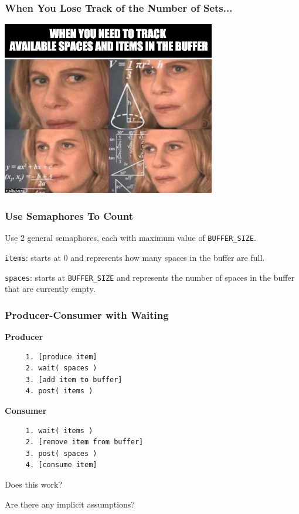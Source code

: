 \begin{frame}
	\frametitle{When You Lose Track of the Number of Sets...}

	\begin{center}
		\includegraphics[width=0.7\textwidth]{images/counting.jpeg}
	\end{center}

\end{frame}


\begin{frame}
	\frametitle{Use Semaphores To Count}

	Use 2 general semaphores, each with maximum value of \texttt{BUFFER\_SIZE}.

	\texttt{items}: starts at 0 and represents how many spaces in the buffer are full.

	\texttt{spaces}: starts at \texttt{BUFFER\_SIZE} and represents the number of spaces in the buffer that are currently empty.

\end{frame}


\begin{frame}[fragile]
	\frametitle{Producer-Consumer with Waiting}

	\begin{multicols}{2}
		\textbf{Producer}
		\begin{verbatim}
	 1. [produce item]
	 2. wait( spaces )
	 3. [add item to buffer]
	 4. post( items )
  \end{verbatim}
		\columnbreak
		\textbf{Consumer}
		\begin{verbatim}
	 1. wait( items )
	 2. [remove item from buffer]
	 3. post( spaces )
	 4. [consume item]
  \end{verbatim}
	\end{multicols}
	\vspace{-2em}

	Does this work?

	Are there any implicit assumptions?

\end{frame}

